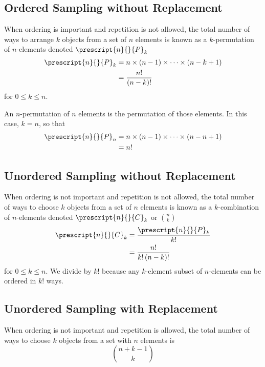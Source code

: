 \documentclass{article}
\begin{document}
\subsection{Ordered Sampling without Replacement}
When ordering is important and repetition is not allowed, the total
number of ways to arrange \(k\) objects from a set of \(n\) elements is
known as a \(k\)-permutation of \(n\)-elements denoted
\(\prescript{n}{}{P}_k\)
\begin{align*}
    \prescript{n}{}{P}_k & = n \times \left( n - 1 \right) \times \cdots \times \left( n - k + 1 \right) \\
                         & = \frac{n!}{\left( n - k \right)!}
\end{align*}
for \(0 \leq k \leq n\).
\begin{definition}
    An \(n\)-permutation of \(n\) elements is the permutation of those elements.
    In this case, \(k = n\), so that
    \begin{align*}
        \prescript{n}{}{P}_n & = n \times \left( n - 1 \right) \times \cdots \times \left( n - n + 1 \right) \\
                             & = n!
    \end{align*}
\end{definition}
\subsection{Unordered Sampling without Replacement}
When ordering is not important and repetition is not allowed, the total
number of ways to choose \(k\) objects from a set of \(n\) elements is
known as a \(k\)-combination of \(n\)-elements denoted
\(\prescript{n}{}{C}_k\) or \(\binom{n}{k}\)
\begin{align*}
    \prescript{n}{}{C}_k & = \frac{\prescript{n}{}{P}_k}{k!}     \\
                         & = \frac{n!}{k! \left( n - k \right)!}
\end{align*}
for \(0 \leq k \leq n\). We divide by \(k!\) because any \(k\)-element subset of \(n\)-elements
can be ordered in \(k!\) ways.
\subsection{Unordered Sampling with Replacement}
When ordering is not important and repetition is allowed, the total
number of ways to choose \(k\) objects from a set with \(n\) elements
is
\begin{equation*}
    \binom{n + k - 1}{k}
\end{equation*}
\end{document}
